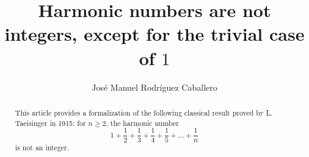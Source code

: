 \documentclass[11pt,a4paper]{article}
\begin{document}
\title{Harmonic numbers are not integers, except for the trivial case of $1$}
\author{Jos\'e Manuel Rodr\'iguez Caballero}
\maketitle

\begin{abstract}
This article provides a formalization of the following classical result proved by L. Taeisinger \cite{theisinger1915bemerkung} in 1915: for $n \geq 2$, the harmonic number $$1 + \frac{1}{2} + \frac{1}{3} + \frac{1}{4} + \frac{1}{5} + ... + \frac{1}{n}$$
is not an integer.
\end{abstract}

\tableofcontents






\end{document}
